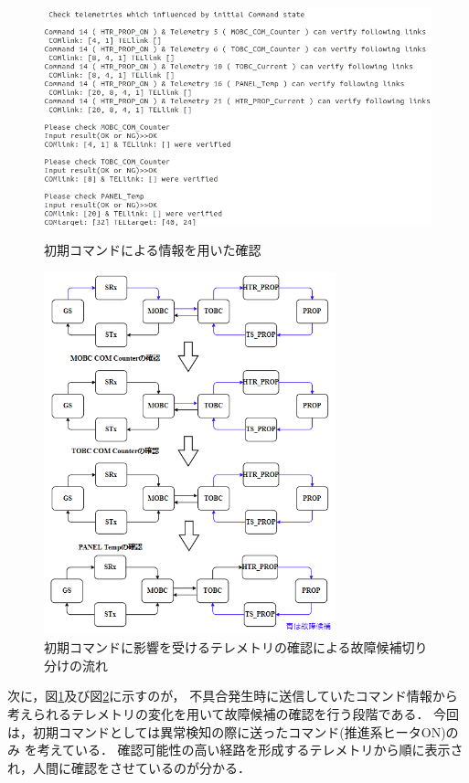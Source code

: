 \documentclass[11pt]{jsreport}
\begin{document}
\begin{figure}[H]
   \centering
      \includegraphics[height=7.0cm]{figure/COM14_TEL17_iniCOM_phase.png}
      \caption{初期コマンドによる情報を用いた確認}
      \label{fig:ini_COM_phase}
\end{figure}
\begin{figure}[H]
   \centering
      \includegraphics[height=10.5cm]{figure/iniCOM_process_HTR_PROP_fault.png}
      \caption{初期コマンドに影響を受けるテレメトリの確認による故障候補切り分けの流れ}
      \label{fig:iniCOM_process}
\end{figure}

\newpage
次に，図\ref{fig:ini_COM_phase}及び図\ref{fig:iniCOM_process}に示すのが，
不具合発生時に送信していたコマンド情報から
考えられるテレメトリの変化を用いて故障候補の確認を行う段階である．
今回は，初期コマンドとしては異常検知の際に送ったコマンド(推進系ヒータON)のみ
を考えている．
確認可能性の高い経路を形成するテレメトリから順に表示され，人間に確認をさせているのが分かる．
\end{document}
